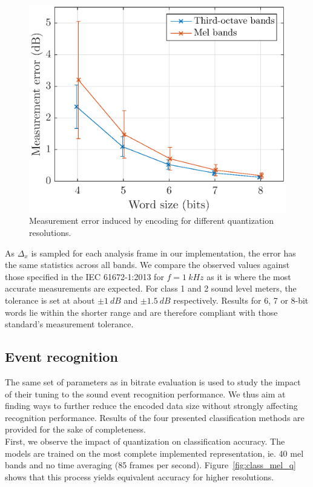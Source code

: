 \documentclass[final,3p,times,twocolumn]{elsarticle}
\begin{document}
\begin{figure}[htbp]
	\centering
		\includegraphics[width=\columnwidth]{figures/error_qall.eps}
	\caption{Measurement error induced by encoding for different quantization resolutions.}
	\label{fig:error_q}
\end{figure}


As $\Delta_x$ is sampled for each analysis frame in our implementation, the error has the same statistics across all bands. We compare the observed values against those specified in the IEC 61672-1:2013 \cite{iec-norm2} for $f = 1~kHz$ as it is where the most accurate measurements are expected. For class 1 and 2 sound level meters, the tolerance is set at about $\pm 1~dB$ and $\pm 1.5~dB$ respectively. Results for 6, 7 or 8-bit words lie within the shorter range and are therefore compliant with those standard's measurement tolerance.

\subsection{Event recognition}

The same set of parameters as in bitrate evaluation is used to study the impact of their tuning to the sound event recognition performance. We thus aim at finding ways to further reduce the encoded data size without strongly affecting recognition performance. Results of the four presented classification methods are provided for the sake of completeness.\\

First, we observe the impact of quantization on classification accuracy. The models are trained on the most complete implemented representation, ie. 40 mel bands and no time averaging (85 frames per second). Figure~\ref{fig:class_mel_q} shows that this process yields equivalent accuracy for higher resolutions.\\
\end{document}
